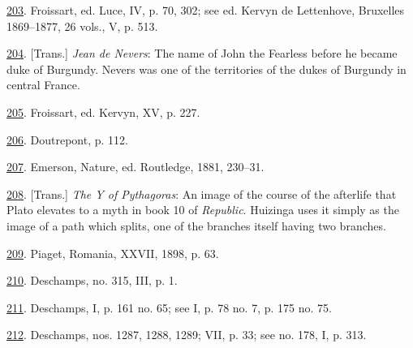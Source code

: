 \protect\hypertarget{23_NOTES.xhtmlux5cux23id_1532}{\protect\hyperlink{10_Chapter_Three__THE_HEROIC_DREAM.xhtmlux5cux23id_1531}{203}}.
Froissart, ed. Luce, IV, p. 70, 302; see ed. Kervyn de Lettenhove,
Bruxelles 1869--1877, 26 vols., V, p. 513.

\protect\hypertarget{23_NOTES.xhtmlux5cux23id_1530}{\protect\hyperlink{10_Chapter_Three__THE_HEROIC_DREAM.xhtmlux5cux23id_1529}{204}}.
{[}Trans.{]} \emph{Jean de Nevers}: The name of John the Fearless before
he became duke of Burgundy. Nevers was one of the territories of the
dukes of Burgundy in central France.

\protect\hypertarget{23_NOTES.xhtmlux5cux23id_1528}{\protect\hyperlink{10_Chapter_Three__THE_HEROIC_DREAM.xhtmlux5cux23id_1527}{205}}.
Froissart, ed. Kervyn, XV, p. 227.

\protect\hypertarget{23_NOTES.xhtmlux5cux23id_1526}{\protect\hyperlink{10_Chapter_Three__THE_HEROIC_DREAM.xhtmlux5cux23id_1525}{206}}.
Doutrepont, p. 112.

\protect\hypertarget{23_NOTES.xhtmlux5cux23id_1524}{\protect\hyperlink{10_Chapter_Three__THE_HEROIC_DREAM.xhtmlux5cux23id_1523}{207}}.
Emerson, Nature, ed. Routledge, 1881, 230--31.

\protect\hypertarget{23_NOTES.xhtmlux5cux23id_1522}{\protect\hyperlink{10_Chapter_Three__THE_HEROIC_DREAM.xhtmlux5cux23id_1521}{208}}.
{[}Trans.{]} \emph{The Y of Pythagoras}: An image of the course of the
afterlife that Plato elevates to a myth in book 10 of \emph{Republic}.
Huizinga uses it simply as the image of a path which splits, one of the
branches itself having two branches.

\protect\hypertarget{23_NOTES.xhtmlux5cux23id_1520}{\protect\hyperlink{10_Chapter_Three__THE_HEROIC_DREAM.xhtmlux5cux23id_1519}{209}}.
Piaget, Romania, XXVII, 1898, p. 63.

\protect\hypertarget{23_NOTES.xhtmlux5cux23id_1518}{\protect\hyperlink{10_Chapter_Three__THE_HEROIC_DREAM.xhtmlux5cux23id_1517}{210}}.
Deschamps, no. 315, III, p. 1.

\protect\hypertarget{23_NOTES.xhtmlux5cux23id_1516}{\protect\hyperlink{10_Chapter_Three__THE_HEROIC_DREAM.xhtmlux5cux23id_1515}{211}}.
Deschamps, I, p. 161 no. 65; see I, p. 78 no. 7, p. 175 no. 75.

\protect\hypertarget{23_NOTES.xhtmlux5cux23id_1514}{\protect\hyperlink{10_Chapter_Three__THE_HEROIC_DREAM.xhtmlux5cux23id_1513}{212}}.
Deschamps, nos. 1287, 1288, 1289; VII, p. 33; see no. 178, I, p. 313.

